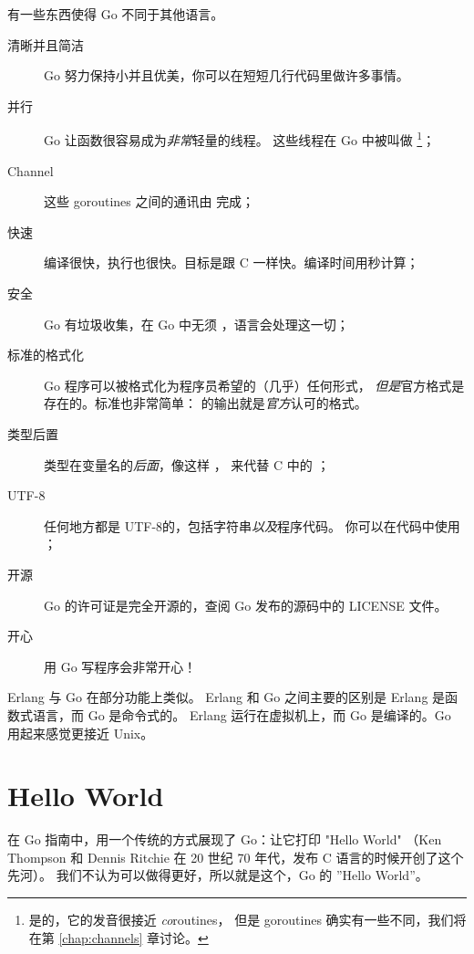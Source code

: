 \noindent{}有一些东西使得 Go 不同于其他语言。
\begin{description}
\item[清晰并且简洁]
Go 努力保持小并且优美，你可以在短短几行代码里做许多事情。

\item[并行]
Go 让函数很容易成为\emph{非常}轻量的线程。
这些线程在 Go 中被叫做  
\footnote{是的，它的发音很接近 \emph{co}routines，
但是 goroutines 确实有一些不同，我们将在第 \ref{chap:channels} 章讨论。}；

\item[Channel]
这些 goroutines 之间的通讯由
 \cite{csp, hoare} 完成；

\item[快速]
编译很快，执行也很快。目标是跟 C 一样快。编译时间用秒计算；

\item[安全]
Go 有垃圾收集，在 Go 中无须 ，语言会处理这一切；

\item[标准的格式化]
Go 程序可以被格式化为程序员希望的（几乎）任何形式，
\emph{但是}官方格式是存在的。标准也非常简单：
 的输出就是\emph{官方}认可的格式。

\item[类型后置]
类型在变量名的\emph{后面}，像这样 ，
来代替 C 中的 ；

\item[UTF-8]
任何地方都是 UTF-8的，包括字符串\emph{以及}程序代码。 
你可以在代码中使用 ；

\item[开源]
Go 的许可证是完全开源的，查阅 Go 发布的源码中的 LICENSE 文件。

\item[开心]
用 Go 写程序会非常开心！

\end{description}
Erlang \cite{erlang} 与 Go 在部分功能上类似。
Erlang 和 Go 之间主要的区别是 Erlang 是函数式语言，而 Go 是命令式的。
Erlang 运行在虚拟机上，而 Go 是编译的。Go 用起来感觉更接近 Unix。

\section{Hello World}
\label{sec:hello world}
在 Go 指南中，用一个传统的方式展现了 Go：让它打印 "Hello World"
（Ken Thompson 和 Dennis Ritchie 在 20 世纪 70 年代，发布 C 语言的时候开创了这个先河）。
我们不认为可以做得更好，所以就是这个，Go 的 ''Hello World''。

